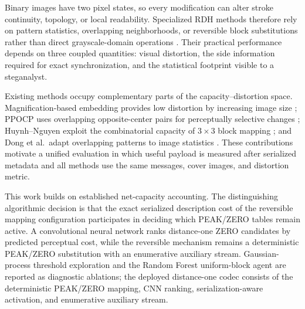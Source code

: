 \documentclass[a4paper,fleqn]{cas-dc}
\begin{document}
Binary images have two pixel states, so every modification can alter
stroke continuity, topology, or local readability. Specialized RDH methods
therefore rely on pattern statistics, overlapping neighborhoods, or reversible
block substitutions rather than direct grayscale-domain operations
\cite{Chhajed2023BlockDiagonal,Huynh2025BlockMapping,Yang2023Large,
Ren2023Sliding,Dong2020Adaptive,Zhang2019Magnification,Yin2020PPOCP,
Yin2020SymmetricFlipping,Ren2019Encrypted,Feng2015Secure,Xuan2008RunLength}. Their practical performance depends
on three coupled quantities: visual distortion, the side information required
for exact synchronization, and the statistical footprint visible to a
steganalyst.

Existing methods occupy complementary parts of the capacity--distortion space.
Magnification-based embedding provides low distortion by increasing image size
\cite{Zhang2019Magnification}; PPOCP
uses overlapping opposite-center pairs for perceptually selective changes
\cite{Yin2020PPOCP}; Huynh--Nguyen exploit the combinatorial capacity of
$3\times3$ block mapping \cite{Huynh2025BlockMapping}; and Dong et al.\ adapt
overlapping patterns to image statistics \cite{Dong2020Adaptive}. These
contributions motivate a unified evaluation in
which useful payload is measured after serialized metadata and all methods use
the same messages, cover images, and distortion metric.

This work builds on established net-capacity accounting. The distinguishing
algorithmic decision is that the exact serialized description cost of the
reversible mapping configuration participates in deciding which PEAK/ZERO
tables remain active. A convolutional neural network ranks
distance-one ZERO candidates by predicted perceptual cost, while the
reversible mechanism remains a deterministic PEAK/ZERO substitution with an
enumerative auxiliary stream. Gaussian-process threshold exploration and the
Random Forest uniform-block agent are reported as diagnostic ablations; the
deployed distance-one codec consists of the deterministic PEAK/ZERO mapping,
CNN ranking, serialization-aware activation, and enumerative auxiliary stream.
\end{document}
